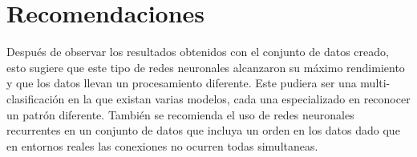 \chapter*{Recomendaciones}\label{chapter:recommendations}

Después de observar los resultados obtenidos con el conjunto de datos creado, esto sugiere que este tipo de redes neuronales alcanzaron su máximo rendimiento y que los datos llevan un procesamiento diferente. Este pudiera ser una multi-clasificación en la que existan varias modelos, cada una especializado en reconocer un patrón diferente. También se recomienda el uso de redes neuronales recurrentes en un conjunto de datos que incluya un orden en los datos dado que en entornos reales las conexiones no ocurren todas simultaneas.